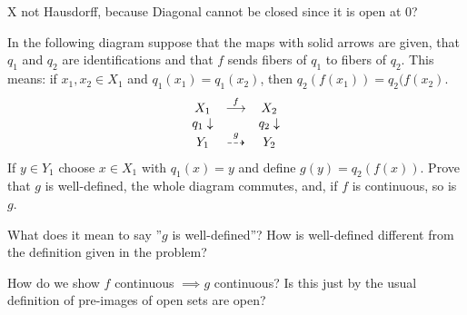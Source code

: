 \documentclass{jhwhw}
\begin{document}
\part{}%
X not Hausdorff, because Diagonal cannot be closed since it is open at 0? 

\problem{} %
In the following diagram suppose that the maps with solid arrows are given, that $q_1$ and $q_2$ are identifications and that $f$ sends fibers of $q_1$ to fibers of $q_2$.  This means:   if $x_1,x_2\in X_1$ and $q_1(x_1) = q_1(x_2)$, then $q_2(f(x_1)) = q_2(f(x_2)$.
\begin{eqnarray*}
	\begin{array}{ccc}
		X_1 & \buildrel f \over\longrightarrow & X_2 \\
		{q_1}\downarrow &  & {q_2}\downarrow\\
		Y_1 & \buildrel g \over\dashrightarrow & Y_2
	\end{array}
\end{eqnarray*}
If $y\in Y_1$ choose  $x\in X_1$ with $q_1(x) = y$ and define $g(y) = q_2(f(x))$.  Prove that $g$ is well-defined, the whole diagram commutes, and, if $f$ is continuous, so is $g$.
\solution{}

What does it mean to say ''$g$ is well-defined''? How is well-defined different from the definition given in the problem?

How do we show $f$ continuous $\implies g$ continuous? Is this just by the usual definition of pre-images of open sets are open?
\end{document}
